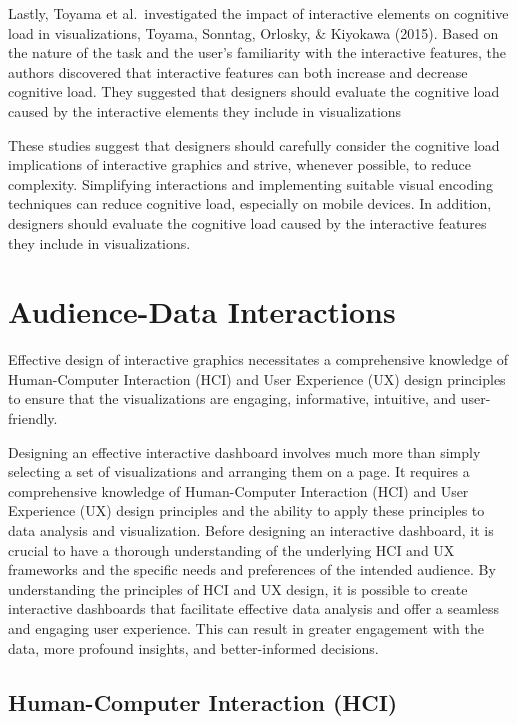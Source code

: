 \documentclass[print]{nuthesis}
\begin{document}
Lastly, Toyama et al.~investigated the impact of interactive elements on cognitive load in visualizations, Toyama, Sonntag, Orlosky, \& Kiyokawa (2015).
Based on the nature of the task and the user's familiarity with the interactive features, the authors discovered that interactive features can both increase and decrease cognitive load.
They suggested that designers should evaluate the cognitive load caused by the interactive elements they include in visualizations

These studies suggest that designers should carefully consider the cognitive load implications of interactive graphics and strive, whenever possible, to reduce complexity.
Simplifying interactions and implementing suitable visual encoding techniques can reduce cognitive load, especially on mobile devices.
In addition, designers should evaluate the cognitive load caused by the interactive features they include in visualizations.

\hypertarget{audience-data-interactions}{%
\section{Audience-Data Interactions}\label{audience-data-interactions}}

Effective design of interactive graphics necessitates a comprehensive knowledge of Human-Computer Interaction (HCI) and User Experience (UX) design principles to ensure that the visualizations are engaging, informative, intuitive, and user-friendly.

Designing an effective interactive dashboard involves much more than simply selecting a set of visualizations and arranging them on a page.
It requires a comprehensive knowledge of Human-Computer Interaction (HCI) and User Experience (UX) design principles and the ability to apply these principles to data analysis and visualization.
Before designing an interactive dashboard, it is crucial to have a thorough understanding of the underlying HCI and UX frameworks and the specific needs and preferences of the intended audience.
By understanding the principles of HCI and UX design, it is possible to create interactive dashboards that facilitate effective data analysis and offer a seamless and engaging user experience.
This can result in greater engagement with the data, more profound insights, and better-informed decisions.

\hypertarget{human-computer-interaction-hci}{%
\subsection{Human-Computer Interaction (HCI)}\label{human-computer-interaction-hci}}
\end{document}
